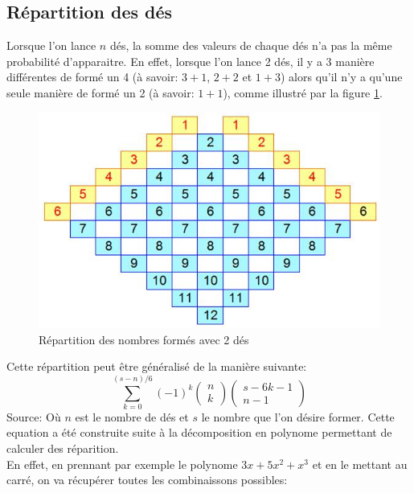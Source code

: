 \documentclass[letterpaper]{article}
\begin{document}
  \subsection{Répartition des dés}
    \label{repart_des}
    Lorsque l'on lance $n$ dés, la somme des valeurs de chaque dés n'a pas la même probabilité
    d'apparaitre.  En effet, lorsque l'on lance 2 dés, il y a 3 manière différentes de formé
    un 4 (à savoir: $3+1$, $2+2$ et $1+3$) alors qu'il n'y a qu'une seule manière de formé un 
    2 (à savoir: $1+1$), comme illustré par la figure \ref{tableau_repartition_des}.
    \begin{figure}[h]
      \centering
      \includegraphics[scale=0.4]{./Images/RepartitionDes.jpg}
	\caption{Répartition des nombres formés avec 2 dés \citep{IMG_Des}}
      \label{tableau_repartition_des}
    \end{figure}
    Cette répartition peut être généralisé de la manière suivante:
    $$\sum\limits_{k=0}^{(s-n)/6} (-1)^k \begin{pmatrix}n \\ k\end{pmatrix} 
      \begin{pmatrix}s-6k-1 \\n-1\end{pmatrix}$$
    Source: %
    Où $n$ est le nombre de dés et $s$ le nombre que l'on désire former.  Cette equation
    a été construite suite à la décomposition en polynome permettant de calculer des
    réparition.\\
    En effet, en prennant par exemple le polynome $3x + 5x^2 + x^3$ et en le mettant au 
    carré, on va récupérer toutes les combinaissons possibles:
\end{document}
